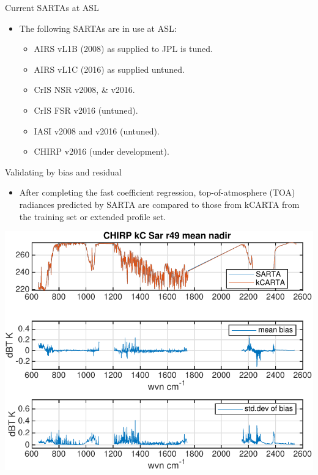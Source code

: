 \documentclass[10pt,t]{beamer}
\begin{document}
\begin{frame}{Current SARTAs at ASL}

  \begin{itemize}
  \item The following SARTAs are in use at ASL:
    \begin{itemize}
    \item AIRS vL1B (2008) as supplied to JPL is tuned.
    \item AIRS vL1C (2016) as supplied untuned.
    \item CrIS NSR v2008, \& v2016.
    \item CrIS FSR v2016 (untuned).
    \item IASI v2008 and v2016 (untuned).
    \item CHIRP v2016 (under development).
    \end{itemize}
  \end{itemize}
  

\end{frame}
\begin{frame}{Validating by bias and residual}

  \begin{itemize}
  \item After completing the fast coefficient regression, top-of-atmosphere (TOA) radiances predicted by SARTA are compared to those from kCARTA from the training set or extended profile set.
  \end{itemize}
      \begin{center}
    \includegraphics[width=0.6\linewidth]{./Figs/chirp_49regr_sar_kc_bias_stdv.pdf}
  \end{center}
  

\end{frame}
\end{document}
